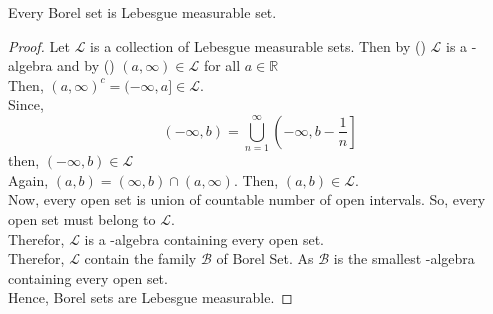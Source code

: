 \begin{theorem}
    Every Borel set is Lebesgue measurable set.
\end{theorem}
\begin{proof}
    Let $\mathcal{L}$ is a collection of Lebesgue measurable sets. Then by () $\mathcal{L}$ is a \sig-algebra and by ()
    $(a,\infty)\in\mathcal{L}$ for all $a\in\mathds{R}$\\
    Then, $(a,\infty)^{c}=(-\infty,a]\in\mathcal{L}$.\\
    Since,
    \[
        (-\infty,b)=\bigcup_{n=1}^{\infty}\left(-\infty,b-\frac{1}{n}\right]
    \]
    then, $(-\infty,b)\in\mathcal{L}$\\
    Again, $(a,b)=(\infty,b)\cap(a,\infty)$. Then, $(a,b)\in\mathcal{L}$.\\
    Now, every open set is union of countable number of open intervals. So, every open set must belong to  $\mathcal{L}$.\\
    Therefor,  $\mathcal{L}$ is a \sig-algebra containing every open set.\\
    Therefor, $\mathcal{L}$ contain the family  $\mathcal{B}$ of Borel Set. As $\mathcal{B}$ is the smallest \sig-algebra containing every open set.\\
    Hence, Borel sets are Lebesgue measurable.
\end{proof}

